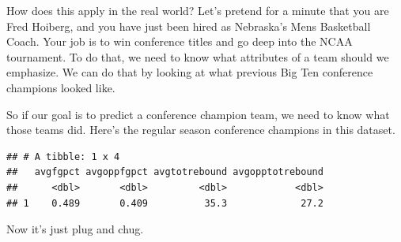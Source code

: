 \documentclass[]{book}
\newenvironment{Shaded}{\begin{snugshade}}{\end{snugshade}}
\newcommand{\DataTypeTok}[1]{\textcolor[rgb]{0.13,0.29,0.53}{#1}}
\newcommand{\KeywordTok}[1]{\textcolor[rgb]{0.13,0.29,0.53}{\textbf{#1}}}
\newcommand{\NormalTok}[1]{#1}
\newcommand{\OperatorTok}[1]{\textcolor[rgb]{0.81,0.36,0.00}{\textbf{#1}}}
\newcommand{\StringTok}[1]{\textcolor[rgb]{0.31,0.60,0.02}{#1}}
\begin{document}
How does this apply in the real world? Let's pretend for a minute that you are Fred Hoiberg, and you have just been hired as Nebraska's Mens Basketball Coach. Your job is to win conference titles and go deep into the NCAA tournament. To do that, we need to know what attributes of a team should we emphasize. We can do that by looking at what previous Big Ten conference champions looked like.

So if our goal is to predict a conference champion team, we need to know what those teams did. Here's the regular season conference champions in this dataset.

\begin{Shaded}
\end{Shaded}

\begin{verbatim}
## # A tibble: 1 x 4
##   avgfgpct avgoppfgpct avgtotrebound avgopptotrebound
##      <dbl>       <dbl>         <dbl>            <dbl>
## 1    0.489       0.409          35.3             27.2
\end{verbatim}

Now it's just plug and chug.
\end{document}
